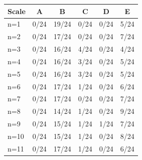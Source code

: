 \begin{tabular}{lccccc}
\toprule
Scale & \cellcolor[HTML]{FFFFFF} A & \cellcolor[HTML]{EA4646} B & \cellcolor[HTML]{9670BD} C & \cellcolor[HTML]{8FEB32} D & \cellcolor[HTML]{19C8C8} E \\
\midrule
n=1 & \cellcolor[HTML]{FFFFFF} 0/24 & \cellcolor[HTML]{EA4646} 19/24 & \cellcolor[HTML]{9670BD} 0/24 & \cellcolor[HTML]{8FEB32} 0/24 & \cellcolor[HTML]{19C8C8} 5/24 \\
n=2 & \cellcolor[HTML]{FFFFFF} 0/24 & \cellcolor[HTML]{EA4646} 17/24 & \cellcolor[HTML]{9670BD} 0/24 & \cellcolor[HTML]{8FEB32} 0/24 & \cellcolor[HTML]{19C8C8} 7/24 \\
n=3 & \cellcolor[HTML]{FFFFFF} 0/24 & \cellcolor[HTML]{EA4646} 16/24 & \cellcolor[HTML]{9670BD} 4/24 & \cellcolor[HTML]{8FEB32} 0/24 & \cellcolor[HTML]{19C8C8} 4/24 \\
n=4 & \cellcolor[HTML]{FFFFFF} 0/24 & \cellcolor[HTML]{EA4646} 16/24 & \cellcolor[HTML]{9670BD} 3/24 & \cellcolor[HTML]{8FEB32} 0/24 & \cellcolor[HTML]{19C8C8} 5/24 \\
n=5 & \cellcolor[HTML]{FFFFFF} 0/24 & \cellcolor[HTML]{EA4646} 16/24 & \cellcolor[HTML]{9670BD} 3/24 & \cellcolor[HTML]{8FEB32} 0/24 & \cellcolor[HTML]{19C8C8} 5/24 \\
n=6 & \cellcolor[HTML]{FFFFFF} 0/24 & \cellcolor[HTML]{EA4646} 17/24 & \cellcolor[HTML]{9670BD} 1/24 & \cellcolor[HTML]{8FEB32} 0/24 & \cellcolor[HTML]{19C8C8} 6/24 \\
n=7 & \cellcolor[HTML]{FFFFFF} 0/24 & \cellcolor[HTML]{EA4646} 17/24 & \cellcolor[HTML]{9670BD} 0/24 & \cellcolor[HTML]{8FEB32} 0/24 & \cellcolor[HTML]{19C8C8} 7/24 \\
n=8 & \cellcolor[HTML]{FFFFFF} 0/24 & \cellcolor[HTML]{EA4646} 14/24 & \cellcolor[HTML]{9670BD} 1/24 & \cellcolor[HTML]{8FEB32} 0/24 & \cellcolor[HTML]{19C8C8} 9/24 \\
n=9 & \cellcolor[HTML]{FFFFFF} 0/24 & \cellcolor[HTML]{EA4646} 15/24 & \cellcolor[HTML]{9670BD} 1/24 & \cellcolor[HTML]{8FEB32} 1/24 & \cellcolor[HTML]{19C8C8} 7/24 \\
n=10 & \cellcolor[HTML]{FFFFFF} 0/24 & \cellcolor[HTML]{EA4646} 15/24 & \cellcolor[HTML]{9670BD} 1/24 & \cellcolor[HTML]{8FEB32} 0/24 & \cellcolor[HTML]{19C8C8} 8/24 \\
n=11 & \cellcolor[HTML]{FFFFFF} 0/24 & \cellcolor[HTML]{EA4646} 17/24 & \cellcolor[HTML]{9670BD} 1/24 & \cellcolor[HTML]{8FEB32} 0/24 & \cellcolor[HTML]{19C8C8} 6/24 \\

\end{tabular}
